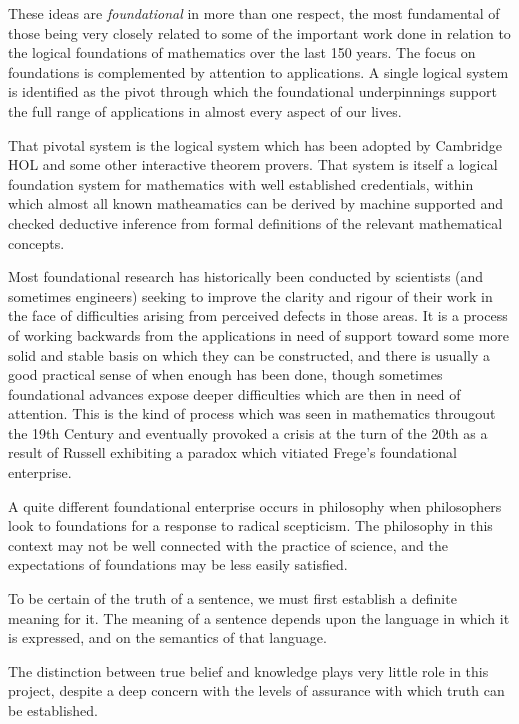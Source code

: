 \documentclass[10pt,titlepage]{book}
\begin{document}
These ideas are \emph{foundational} in more than one respect, the most fundamental of those being very closely related to some of the important work done in relation to the logical foundations of mathematics over the last 150 years.
The focus on foundations is complemented by attention to applications.
A single logical system is identified as the pivot through which the foundational underpinnings support the full range of applications in almost every aspect of our lives.

That pivotal system is the logical system which has been adopted by Cambridge HOL and some other interactive theorem provers.
That system is itself a logical foundation system for mathematics with well established credentials, within which almost all known matheamatics can be derived by machine supported and checked deductive inference from formal definitions of the relevant mathematical concepts.

Most foundational research has historically been conducted by scientists (and sometimes engineers) seeking to improve the clarity and rigour of their work in the face of difficulties arising from perceived defects in those areas.
  It is a process of working backwards from the applications in need of support toward some more solid and stable basis on which they can be constructed, and there is usually a good practical sense of when enough has been done, though sometimes foundational advances expose deeper difficulties which are then in need of attention.
  This is the kind of process which was seen in mathematics througout the 19th Century and eventually provoked a crisis at the turn of the 20th as a result of Russell exhibiting a paradox which vitiated Frege's foundational enterprise.

  A quite different foundational enterprise occurs in philosophy when philosophers look to foundations for a response to radical scepticism.  The philosophy in this context may not be well connected with the practice of science, and the expectations of foundations may be less easily satisfied.

To be certain of the truth of a sentence, we must first establish a definite meaning for it.
The meaning of a sentence depends upon the language in which it is expressed, and on the semantics of that language.

The distinction between true belief and knowledge plays very little role in this project, despite a deep concern with the levels of assurance with which truth can be established.
\end{document}

